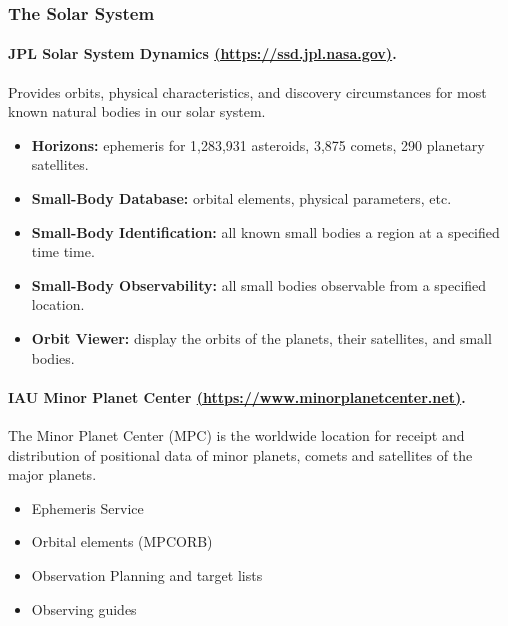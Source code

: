 \subsubsection{The Solar System}

\begin{frame}{\insertsubsubsectionhead}
  \framesubtitle{JPL Solar System Dynamics \href{https://ssd.jpl.nasa.gov/}{(https://ssd.jpl.nasa.gov)}.}
  
  {\Large Provides orbits, physical characteristics, and discovery circumstances
  for most known natural bodies in our solar system.} \\[1ex]

  \begin{itemize}
  \item \textbf{Horizons:} ephemeris for 1,283,931 asteroids, 3,875 comets, 290 planetary satellites.
  \item \textbf{Small-Body Database:} orbital elements, physical parameters, etc.
  \item \textbf{Small-Body Identification:} all known small bodies a region at a specified time time.
  \item \textbf{Small-Body Observability:} all small bodies observable from a specified location.
  \item \textbf{Orbit Viewer:} display the orbits of the planets, their satellites, and small bodies.
  \end{itemize}

\end{frame}


\begin{frame}{\insertsubsubsectionhead}
  \framesubtitle{IAU Minor Planet Center \href{https://www.minorplanetcenter.net/}{(https://www.minorplanetcenter.net)}.}
  
  {\Large The Minor Planet Center (MPC) is the worldwide location for receipt and distribution
  of positional data of minor planets, comets and satellites of the major planets.}\\[1ex]

  \begin{itemize}
  \item Ephemeris Service
  \item Orbital elements (MPCORB)
  \item Observation Planning and target lists
  \item Observing guides
  \end{itemize}

\end{frame}


